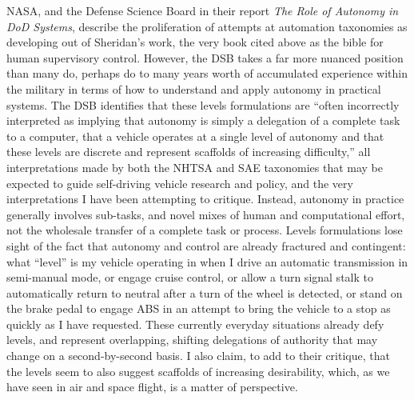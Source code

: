 NASA, and the Defense Science Board in their report \emph{The Role of
Autonomy in DoD Systems}, describe the proliferation of attempts at
automation taxonomies as developing out of Sheridan's work, the very
book cited above as the bible for human supervisory control.\cite{???}
However, the DSB takes a far more nuanced position than many do,
perhaps do to many years worth of accumulated experience within the
military in terms of how to understand and apply autonomy in practical
systems. The DSB
identifies that these levels formulations are ``often incorrectly
interpreted as implying that autonomy is simply a delegation of a
complete task to a computer, that a vehicle operates at a single level
of autonomy and that these levels are discrete and represent scaffolds
of increasing difficulty,''\cite{???} all interpretations made by both the
NHTSA and SAE taxonomies that may be expected to guide self-driving
vehicle research and policy, and the very interpretations I have been
attempting to critique. Instead, autonomy in practice generally
involves sub-tasks, and novel mixes of human and computational effort,
not the wholesale transfer of a complete task or process. Levels
formulations lose sight of the fact that autonomy and control are
already fractured and contingent:  what ``level'' is my vehicle
operating in when I drive an automatic transmission in semi-manual
mode, or engage cruise control, or allow a turn signal stalk to
automatically return to neutral after a turn of the wheel is detected,
or stand on the brake pedal to engage ABS in an attempt to bring the
vehicle to a stop as quickly as I have requested. These currently
everyday situations already defy levels, and represent overlapping, shifting
delegations of authority that may change on a second-by-second basis.
I also claim, to add to their critique, that the
levels seem to also suggest scaffolds of increasing desirability,
which, as we have seen in air and space flight, is a matter of perspective.

